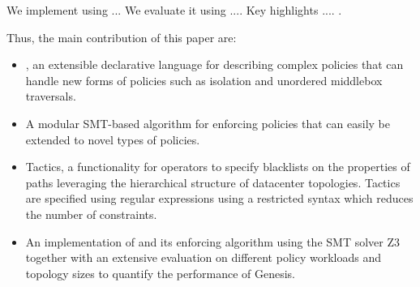 
We implement \Name using ... We evaluate it using .... Key highlights .... .

Thus, the main contribution of this paper are: 
\begin{itemize}
\item \Name, an extensible declarative language for describing complex policies that can
		handle new forms of policies such as isolation and unordered middlebox traversals.				
\item A modular SMT-based algorithm for enforcing \Name policies that can easily be extended
			to novel types of policies.
\item Tactics, a functionality for operators to specify blacklists on the properties of paths
 leveraging the hierarchical structure of datacenter topologies. 
 Tactics are specified using regular expressions using a restricted syntax which reduces the number of constraints.
\item An implementation of \Name and its enforcing algorithm using the SMT
		solver Z3 together with an extensive evaluation on different policy workloads and topology 
		sizes to quantify the performance of Genesis. 
\end{itemize}

